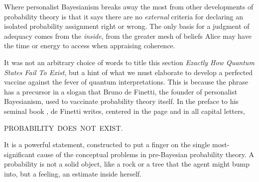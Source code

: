 \documentclass[aps,pra,superscriptaddress,10pt,tightenlines,twocolumn,nofootinbib]{revtex4}
\begin{document}
Where personalist Bayesianism breaks away the most from other developments of probability theory is that it says there are no {\it external\/} criteria for declaring an isolated probability assignment right or wrong.  The only basis for a judgment of adequacy comes from the {\it inside}, from the greater mesh of beliefs Alice may have the time or energy to access when appraising coherence.

It was not an arbitrary choice of words to title this section {\it
  Exactly How Quantum States Fail To Exist}, but a hint of what we must
elaborate to develop a perfected vaccine against the fever of quantum
interpretations.  This is because the phrase has a precursor in a
slogan that Bruno de Finetti, the founder of personalist Bayesianism, used
to vaccinate probability theory itself.  In the preface to his seminal
book \cite{DeFinetti90}, de Finetti writes, centered in the page and
in all capital letters,
\begin{center}
PROBABILITY$\,$ DOES$\,$ NOT$\,$ EXIST.
\end{center}
It is a powerful statement, constructed to put a finger on the single most-significant cause of the conceptual problems in pre-Bayesian probability theory.  A probability is not a solid object, like a rock or a tree that the agent might bump into, but a feeling, an estimate inside herself.
\end{document}
